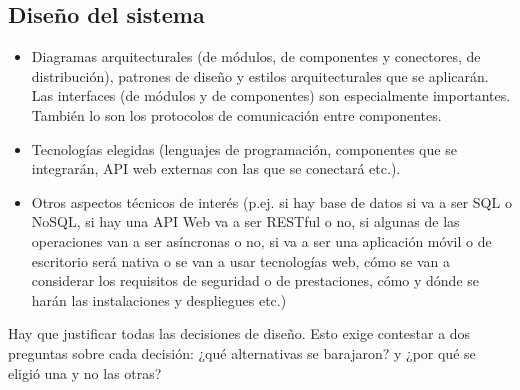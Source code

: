 \documentclass[12pt]{article}%
\begin{document}
\subsection{Dise\~no del sistema}
\begin{itemize}
	\item Diagramas arquitecturales (de m\'odulos, de componentes y conectores, de distribuci\'on), patrones de dise\~no y estilos arquitecturales que se aplicar\'an. Las interfaces (de m\'odulos y de componentes) son especialmente importantes. Tambi\'en lo son los protocolos de comunicaci\'on entre componentes.
	\item Tecnolog\'ias elegidas (lenguajes de programaci\'on, componentes que se integrar\'an, API web externas con las que se conectar\'a etc.).
	\item Otros aspectos t\'ecnicos de inter\'es (p.ej. si hay base de datos si va a ser SQL o NoSQL, si hay una API Web va a ser RESTful o no, si algunas de las operaciones van a ser as\'incronas o no, si va a ser una aplicaci\'on m\'ovil o de escritorio ser\'a nativa o se van a usar tecnolog\'ias web, c\'omo se van a considerar los requisitos de seguridad o de prestaciones, c\'omo y d\'onde se har\'an las instalaciones y despliegues etc.)
\end{itemize}

Hay que justificar todas las decisiones de dise\~no. Esto exige contestar a dos preguntas sobre cada decisi\'on: ¿qu\'e alternativas se barajaron? y ¿por qu\'e se eligi\'o una y no las otras?


\end{document}
